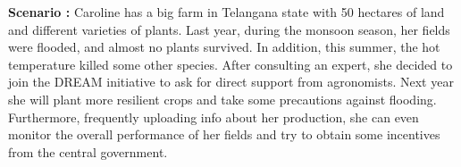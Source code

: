 \begin{flushleft}
\textbf{Scenario :} 
Caroline has a big farm in Telangana state with 50 hectares of land and different varieties of plants. Last year, during the monsoon season, her fields were flooded, and almost no plants survived. In addition, this summer, the hot temperature killed some other species.
After consulting an expert, she decided to join the DREAM initiative to ask for direct support from agronomists. Next year she will plant more resilient crops and take some precautions against flooding.
Furthermore, frequently uploading info about her production, she can even monitor the overall performance of her fields and try to obtain some incentives from the central government.
\end{flushleft}